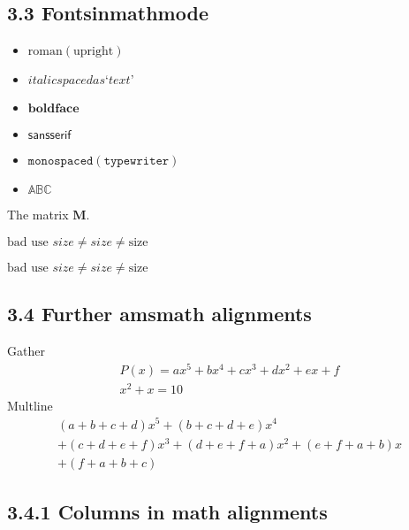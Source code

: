\documentclass[a4paper]{article}
\begin{document}
												\subsection*{}

\subsection*{ 3.3 Fontsinmathmode}

\begin{itemize}
\item$\mathrm{roman(upright)}$

\item$\mathit{italic spaced as ‘text’}$

\item$\mathbf{boldface}$

\item$\mathsf{sansserif}$

\item$\mathtt{monospaced(typewriter)}$

\item$\mathbb{ABC}$
\end{itemize}

 The matrix $\mathbf{M}$.

$\text{bad use } size \neq \mathit{size} \neq \mathrm{size} $

 \textit{$\text{bad use } size \neq \mathit{size} \neq
 \mathrm{size} $}

\subsection*{ 3.4 Further amsmath alignments}

 Gather
 \begin{gather}
 P(x)=ax^{5}+bx^{4}+cx^{3}+dx^{2}+ex +f\\
 x^2+x=10
 \end{gather}
 Multline
 \begin{multline*}
 (a+b+c+d)x^{5}+(b+c+d+e)x^{4} \\
 +(c+d+e+f)x^{3}+(d+e+f+a)x^{2}+(e+f+a+b)x\\
 + (f+a+b+c)
 \end{multline*}




\subsection*{ 3.4.1 Columns in math alignments}
\end{document}
